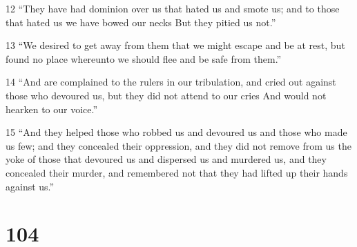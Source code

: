\par 12 “They have had dominion over us that hated us and smote us; and to those that hated us we have bowed our necks But they pitied us not.”
\par 13 “We desired to get away from them that we might escape and be at rest, but found no place whereunto we should flee and be safe from them.”
\par 14 “And are complained to the rulers in our tribulation, and cried out against those who devoured us, but they did not attend to our cries And would not hearken to our voice.”
\par 15 “And they helped those who robbed us and devoured us and those who made us few; and they concealed their oppression, and they did not remove from us the yoke of those that devoured us and dispersed us and murdered us, and they concealed their murder, and remembered not that they had lifted up their hands against us.”

\chapter{104}


